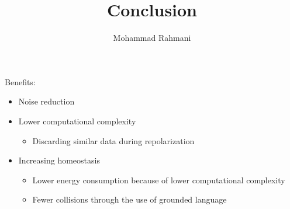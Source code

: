 \documentclass[a4paper]{article}
\title{Conclusion}
\date{}
\author{Mohammad Rahmani}
\begin{document}
    \maketitle

    Benefits:
    \begin{itemize}
        \item Noise reduction
        \item Lower computational complexity
        \begin{itemize}
            \item Discarding similar data during repolarization
        \end{itemize}
        \item Increasing homeostasis
        \begin{itemize}
            \item Lower energy consumption because of lower computational complexity
            \item Fewer collisions through the use of grounded language
        \end{itemize}
    \end{itemize}


    
    
\end{document}
